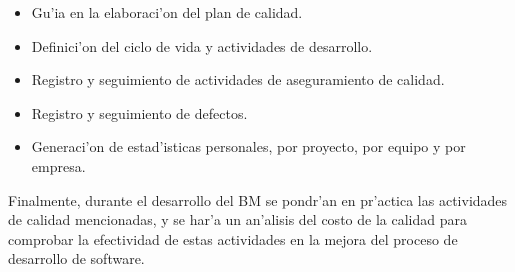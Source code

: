 \begin{itemize}
	\item Gu'ia en la elaboraci'on del plan de calidad.
	\item Definici'on del ciclo de vida y actividades de desarrollo.
	\item Registro y seguimiento de actividades de aseguramiento de calidad.
	\item Registro y seguimiento de defectos.
	\item Generaci'on de estad'isticas personales, por proyecto, por equipo y por empresa.
\end{itemize}

Finalmente, durante el desarrollo del BM se pondr'an en pr'actica las actividades de calidad mencionadas, y se har'a un an'alisis del costo de la calidad para comprobar la efectividad de estas actividades en la mejora del proceso de desarrollo de software.

\clearpage